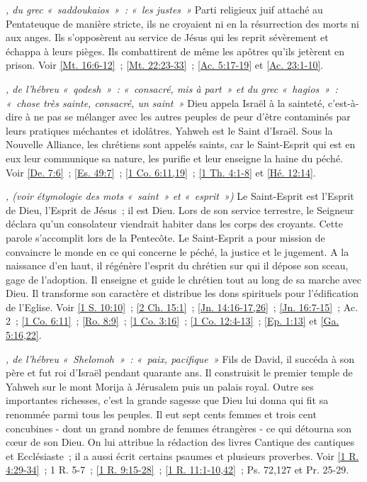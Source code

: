\begin{multicols}{2}
\textit{, du grec «~saddoukaios~»~: «~les justes~»}\newline
Parti religieux juif attaché au Pentateuque de manière stricte, ils ne croyaient ni en la résurrection des morts ni aux anges. Ils s'opposèrent au service de Jésus qui les reprit sévèrement et échappa à leurs pièges. Ils combattirent de même les apôtres qu'ils jetèrent en prison. Voir \vref{Mt. 16:6-12}~; \vref{Mt. 22:23-33}~; \vref{Ac. 5:17-19} et \vref{Ac. 23:1-10}.

\textit{, de l'hébreu «~qodesh~»~: «~consacré, mis à part~» et du grec «~hagios~»~: «~chose très sainte, consacré, un saint~»}\newline
Dieu appela Israël à la sainteté, c'est-à-dire à ne pas se mélanger avec les autres peuples de peur d'être contaminés par leurs pratiques méchantes et idolâtres. Yahweh est le Saint d'Israël. Sous la Nouvelle Alliance, les chrétiens sont appelés saints, car le Saint-Esprit qui est en eux leur communique sa nature, les purifie et leur enseigne la haine du péché. Voir \vref{De. 7:6}~; \vref{Es. 49:7}~; \vref{1 Co. 6:11,19}~; \vref{1 Th. 4:1-8} et \vref{Hé. 12:14}.

\textit{, (voir étymologie des mots «~saint~» et «~esprit~»)}\newline
Le Saint-Esprit est l'Esprit de Dieu, l'Esprit de Jésus~; il est Dieu. Lors de son service terrestre, le Seigneur déclara qu'un consolateur viendrait habiter dans les corps des croyants. Cette parole s'accomplit lors de la Pentecôte. Le Saint-Esprit a pour mission de convaincre le monde en ce qui concerne le péché, la justice et le jugement. A la naissance d'en haut, il régénère l'esprit du chrétien sur qui il dépose son sceau, gage de l'adoption. Il enseigne et guide le chrétien tout au long de sa marche avec Dieu. Il transforme son caractère et distribue les dons spirituels pour l'édification de l'Eglise. Voir \vref{1 S. 10:10}~; \vref{2 Ch. 15:1}~; \vref{Jn. 14:16-17,26}~; \vref{Jn. 16:7-15}~; Ac. 2~; \vref{1 Co. 6:11}~; \vref{Ro. 8:9}~; \vref{1 Co. 3:16}~; \vref{1 Co. 12:4-13}~; \vref{Ep. 1:13} et \vref{Ga. 5:16,22}.

\textit{, de l'hébreu «~Shelomoh~»~: «~paix, pacifique~»}\newline
Fils de David, il succéda à son père et fut roi d'Israël pendant quarante ans. Il construisit le premier temple de Yahweh sur le mont Morija à Jérusalem puis un palais royal. Outre ses importantes richesses, c'est la grande sagesse que Dieu lui donna qui fit sa renommée parmi tous les peuples. Il eut sept cents femmes et trois cent concubines - dont un grand nombre de femmes étrangères - ce qui détourna son cœur de son Dieu. On lui attribue la rédaction des livres Cantique des cantiques et Ecclésiaste~; il a aussi écrit certains psaumes et plusieurs proverbes. Voir \vref{1 R. 4:29-34}~; 1 R. 5-7~; \vref{1 R. 9:15-28}~; \vref{1 R. 11:1-10,42}~; Ps. 72,127 et Pr. 25-29.


\end{multicols}
